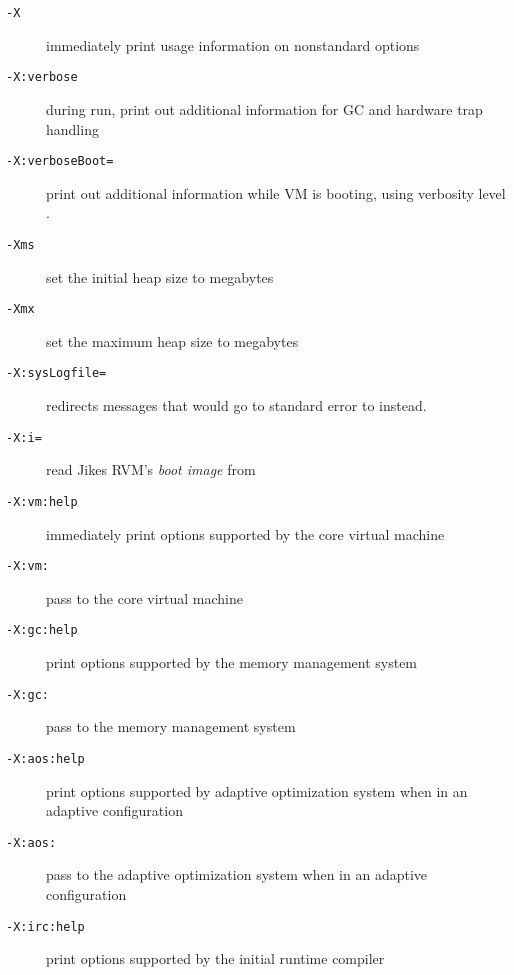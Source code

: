 \begin{description}
\item[{\tt -X}]
immediately print usage information on nonstandard options

\item[{\tt -X:verbose}]
during run, print out additional information for GC and hardware trap handling

\item[{\tt -X:verboseBoot=}]
print out additional information while VM is booting, using verbosity
level .

\item[{\tt -Xms}]
set the initial heap size to  megabytes

\item[{\tt -Xmx}]
set the maximum heap size to  megabytes

\item[{\tt -X:sysLogfile=}]
redirects messages that would go to standard error to  instead.

\item[{\tt -X:i=}]
read Jikes RVM's \emph{boot image} from 

\item[{\tt -X:vm\Mlsq{}:help\Mrsq{}}]
immediately print options supported by the core virtual machine

\item[{\tt -X:vm:}]
pass  to the core virtual machine

\item[{\tt -X:gc\Mlsq{}:help\Mrsq}]
print options supported by the memory management system

\item[{\tt -X:gc:}]
pass  to the memory management system

\item[{\tt -X:aos\Mlsq{}:help\Mrsq{}}]
print options supported by adaptive optimization system when in an
adaptive configuration

\item[{\tt -X:aos:}]
pass  to the adaptive optimization system when in an adaptive configuration

\item[{\tt -X:irc\Mlsq{}:help\Mrsq{}}]
print options supported by the initial runtime compiler


\end{description}
